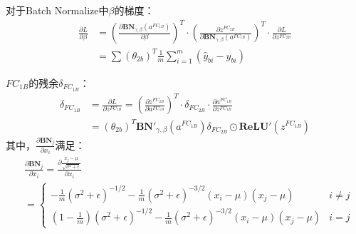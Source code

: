 \begin{solution}
\begin{enumerate}
        对于Batch Normalize中$\beta$的梯度：
        \begin{align*}
            \frac{\partial L}{\partial\beta} &= \left(\frac{\partial \textbf{BN}_{\gamma,\beta}(a^{FC_{1B}})}{\partial \beta}\right)^T \cdot \left(\frac{\partial z^{FC_{2B}}}{\partial\textbf{BN}_{\gamma,\beta}(a^{FC_{1B}})}\right)^T \cdot\frac{\partial L}{\partial z^{FC_{2B}}}\\
            &= \sum\left(\theta_{2b}\right)^T\frac{1}{m}\sum_{i=1}^{m}\left(\hat{y}_{bi}-y_{bi}\right)
        \end{align*}

        $FC_{1B}$的残余$\delta_{FC_{1B}}$：
        \begin{align*}
            \delta_{FC_{1B}} &= \frac{\partial L}{\partial z^{FC_{1B}}} 
            =\left(\frac{\partial z^{FC_{2B}}}{\partial a^{FC_{1B}}}\right)^T \cdot \delta_{FC_{2B}} \cdot \frac{\partial a^{FC_{1B}}}{\partial z^{FC_{1B}}}\\
            &=  (\theta_{2b})^T  \textbf{BN}'_{\gamma,\beta}(a^{FC_{1B}}) \delta_{FC_{2B}} \odot \textbf{ReLU}'(z^{FC_{1B}})
        \end{align*}
        其中，$\frac{\partial\textbf{BN}_j}{\partial x_i}$满足：
        {\small
        \begin{align*}
            &\frac{\partial\textbf{BN}_j}{\partial x_i} = \frac{\partial \frac{x_{j}-\mu}{\sqrt{\sigma^{2}+\epsilon}}}{\partial x_{i}}\\
            &=
            \begin{cases}
                -\frac{1}{m}\left(\sigma^{2}+\epsilon\right)^{-1 / 2}-\frac{1}{m}\left(\sigma^{2}+\epsilon\right)^{-3 / 2}\left(x_{i}-\mu\right)\left(x_{j}-\mu\right)& i\neq j\\
                \left(1-\frac{1}{m}\right)\left(\sigma^{2}+\epsilon\right)^{-1 / 2}-\frac{1}{m}\left(\sigma^{2}+\epsilon\right)^{-3 / 2}\left(x_{i}-\mu\right)\left(x_{j}-\mu\right)& i=j
            \end{cases}
        \end{align*}}
        

\end{enumerate}
\end{solution}
